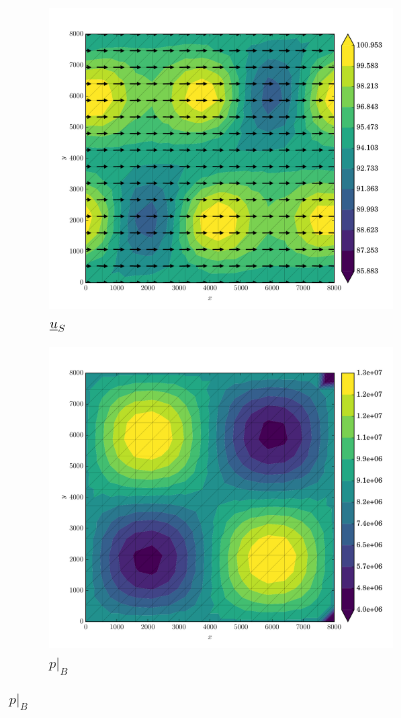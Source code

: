 \begin{figure}
  
  \centering 

  \begin{subfigure}[b]{0.3\linewidth}
    \includegraphics[width=\linewidth]{images/stress_balance/BP/U_mag.pdf}
  \caption{$\underline{u}_S$}
  \label{bp_msb_U}
  \end{subfigure}
  \begin{subfigure}[b]{0.3\linewidth}
    \includegraphics[width=\linewidth]{images/stress_balance/BP/p.pdf}
  \caption{$p |_B$}
  \label{bp_msb_p}
  \end{subfigure}


\end{figure}
